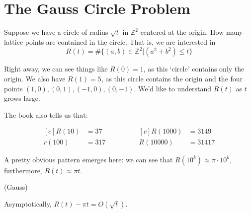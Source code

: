 \classheader{}



\section*{The Gauss Circle Problem}

Suppose we have a circle of radius $\sqrt{t}$ in $\mathbb{Z}^2$ centered at the origin.  How many lattice points are contained in the circle.  That is, we are interested in 
$$R(t) = \#\{(a,b)\in\mathbb{Z}^2|(a^2+b^2)\leq t  \}$$


Right away, we can see things like $R(0)=1$, as this `circle' contains only the origin.  We also have $R(1)=5$, as this circle contains the origin and the four points $(1,0),(0,1),(-1,0),(0,-1)$.    We'd like to understand $R(t)$ as $t$ grows large.

The book also tells us that:

\begin{equation*}
\begin{aligned}[c]
R(10)&=37\\
r(100)&=317
\end{aligned}
\qquad\qquad
\begin{aligned}[c]
R(1000)&=3149\\
R(10000)&=31417
\end{aligned}
\end{equation*}

A pretty obvious pattern emerges here: we can see that $R(10^k)\approx\pi\cdot 10^{k}$, furthermore, $R(t)\approx\pi t$.

\begin{theorem}(Gauss)
	
	Asymptotically, $R(t)-\pi t = O(\sqrt{t})$.
	
	
\end{theorem}


